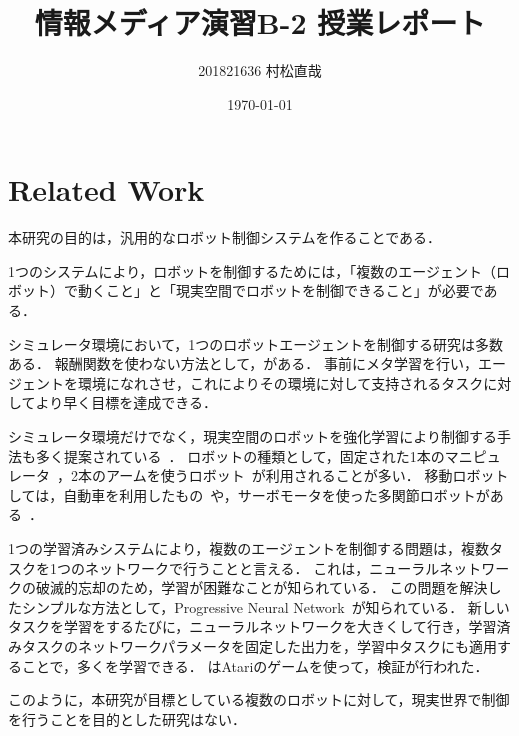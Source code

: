\documentclass[pdflatex,ja=standard]{bxjsarticle}
\title{情報メディア演習B-2 授業レポート}
\author{201821636 村松直哉}
\date{\today}
\begin{document}
\maketitle
%
%
\section{Related Work}

本研究の目的は，汎用的なロボット制御システムを作ることである．

1つのシステムにより，ロボットを制御するためには，「複数のエージェント（ロボット）で動くこと」と「現実空間でロボットを制御できること」が必要である．

シミュレータ環境において，1つのロボットエージェントを制御する研究は多数ある．
報酬関数を使わない方法として，\cite{Gupta}がある．
事前にメタ学習を行い，エージェントを環境になれさせ，これによりその環境に対して支持されるタスクに対してより早く目標を達成できる．

シミュレータ環境だけでなく，現実空間のロボットを強化学習により制御する手法も多く提案されている~\cite{Rusua,James,Levinea,Levine2016,Sadeghia,Kendall,Bousmalis,Ha}．
ロボットの種類として，固定された1本のマニピュレータ~\cite{James,Sadeghia,Bousmalis}，2本のアームを使うロボット~\cite{Levine2016,Levinea}が利用されることが多い．
移動ロボットしては，自動車を利用したもの~\cite{Kendall}や，サーボモータを使った多関節ロボットがある~\cite{Ha}．

1つの学習済みシステムにより，複数のエージェントを制御する問題は，複数タスクを1つのネットワークで行うことと言える．
これは，ニューラルネットワークの破滅的忘却のため，学習が困難なことが知られている．
この問題を解決したシンプルな方法として，Progressive Neural Network~\cite{Rusu}が知られている．
新しいタスクを学習をするたびに，ニューラルネットワークを大きくして行き，学習済みタスクのネットワークパラメータを固定した出力を，学習中タスクにも適用することで，多くを学習できる．
\cite{Rusu}はAtariのゲームを使って，検証が行われた．

このように，本研究が目標としている複数のロボットに対して，現実世界で制御を行うことを目的とした研究はない．



\end{document}
